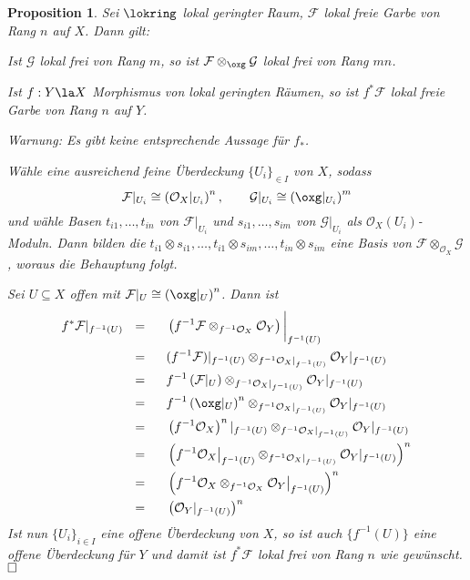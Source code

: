 \documentclass[11pt]{book}
\newtheorem{proposition}[theorem]{Proposition}
\theoremstyle{nonumberbreak}
\newenvironment{pr}[1][]{\ifthenelse{\equal{#1}{}}{\proof}{\proof[#1]}\rm}{\endproof}
\begin{document}
\begin{spacing}{1.4}
\begin{proposition}
Sei $\lokring$ lokal geringter Raum, $\mathcal{F}$ lokal freie Garbe  von Rang $n$ auf $X$. Dann gilt:
\begin{compactenum}
\item Ist $\mathcal{G}$ lokal frei von Rang $m$, so ist $\mathcal{F} \otimes_{\oxg} \mathcal{G}$ lokal frei von Rang $mn$.
\item Ist $f:Y \la X$ Morphismus von lokal geringten Räumen, so ist $f^*\mathcal{F}$ lokal freie Garbe von Rang $n$ auf $Y$.
\end{compactenum}
\textit{Warnung}: Es gibt keine entsprechende Aussage für $f_*$.
\begin{pr}
\begin{compactenum}
\item Wähle eine ausreichend feine Überdeckung $\{U_i\}_{ \in I}$ von $X$, sodass 
$$\mathcal{F} \vert_{U_i} \cong \left( \mathcal{O}_X \vert_{U_i} \right)^n, \qquad \mathcal{G}\vert_{U_i} \cong\left( \oxg\vert_{U_i} \right)^m$$
und wähle Basen $t_{i1}, \ldots, t_{in}$ von $\mathcal{F}\vert_{U_i}$ und $s_{i1}, \ldots, s_{im}$ von $\mathcal{G}\vert_{U_i}$ als $\mathcal{O}_X(U_i)$-Moduln. Dann bilden die $t_{i1} \otimes s_{i1}, \ldots, t_{i1} \otimes s_{im}, \ldots, t_{in} \otimes s_{im}$ eine Basis von $\mathcal{F} \otimes_{\mathcal{O}_X} \mathcal{G}$, woraus die Behauptung folgt.
\item Sei $U \subseteq X$ offen mit $\mathcal{F} \vert_U \cong \left( \oxg\vert_U\right)^n$. Dann ist
\setlength{\abovedisplayskip}{5.5pt}
\setlength{\belowdisplayskip}{5.5pt}
\begin{alignat*}{5}
f^*\mathcal{F} \vert_{f^{-1}(U)} \ \ &=&& \ \ \left( f^{-1}\mathcal{F} \otimes_{f^{-1}\mathcal{O}_X} \mathcal{O}_Y\right)\bigg\vert_{f^{-1}(U)}\\
&=&& \ \ (f^{-1}\mathcal{F}) \vert_{f^{-1}(U)} \otimes_{f^{-1}\mathcal{O}_X \vert_{f^{-1}(U)}} \mathcal{O}_Y \vert_{f^{-1}(U)} \\
&=&& \ \ f^{-1}\left(\mathcal{F}\vert_U\right) \otimes_{f^{-1}\mathcal{O}_X \vert_{f^{-1}(U)}} \mathcal{O}_Y \vert_{f^{-1}(U)} \\
&=&& \ \ f^{-1} \left(\oxg \vert_U\right)^n \otimes_{f^{-1}\mathcal{O}_X \vert_{f^{-1}(U)}} \mathcal{O}_Y \vert_{f^{-1}(U)} \\
&=&& \ \ \left( f^{-1} \mathcal{O}_X\right)^n \vert_{f^{-1}(U)} \otimes_{f^{-1}\mathcal{O}_X \vert_{f^{-1}(U)}} \mathcal{O}_Y \vert_{f^{-1}(U)} \\
&=&& \ \ \left( f^{-1} \mathcal{O}_X \big\vert_{f^{-1}(U)} \otimes_{f^{-1}\mathcal{O}_X \vert_{f^{-1}(U)}} \mathcal{O}_Y \vert_{f^{-1}(U)} \right)^n \\
&=&& \ \ \left( f^{-1} \mathcal{O}_X  \otimes_{f^{-1}\mathcal{O}_X } \mathcal{O}_Y   \big\vert_{f^{-1}(U)}\right)^n\\
&=&& \ \ \left( \mathcal{O}_Y\vert_{f^{-1}(U)}\right)^n
\end{alignat*}
Ist nun $\{U_i\}_{i\in I}$ eine offene Überdeckung von $X$, so ist auch $\{f^{-1}(U)\}$ eine offene Überdeckung für $Y$ und damit ist $f^*\mathcal{F}$ lokal frei von Rang $n$ wie gewünscht. $\hfill \Box$


\end{compactenum}
\end{pr}
\end{proposition}
\end{spacing}
\end{document}
